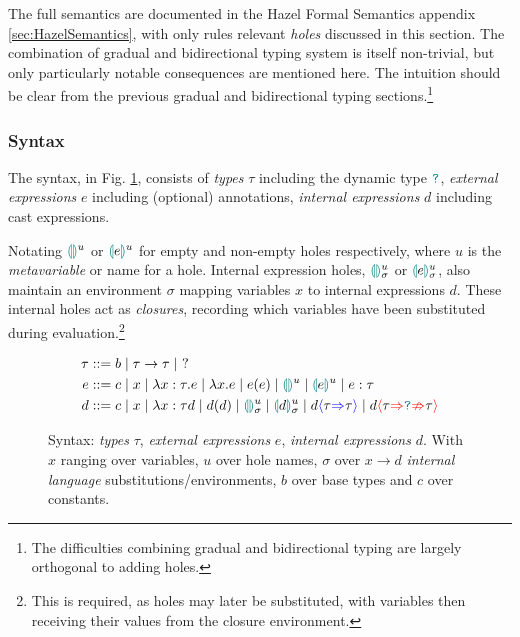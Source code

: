 The full semantics are documented in the Hazel Formal Semantics appendix \ref{sec:HazelSemantics}, with only rules relevant \textit{holes} discussed in this section. The combination of gradual and bidirectional typing system is itself non-trivial, but only particularly notable consequences are mentioned here. The intuition should be clear from the previous gradual and bidirectional typing sections.\footnote{The difficulties combining gradual and bidirectional typing are largely orthogonal to adding holes.}

\subsubsection{Syntax}\label{sec:HazelSyntax}
\par The syntax, in Fig. \ref{fig:syntax}, consists of \textit{types} $\tau$ including the dynamic type $\dyn$, \textit{external expressions} $e$ including (optional) annotations, \textit{internal expressions} $d$ including cast expressions.

Notating $\hole{}^u$ or $\hole[e]^u$ for empty and non-empty holes respectively, where $u$ is the \textit{metavariable} or name for a hole. Internal expression holes, $\hole{}^u_\sigma$ or $\hole[e]^u_\sigma$, also maintain an environment $\sigma$ mapping variables $x$ to internal expressions $d$. These internal holes act as \textit{closures}, recording which variables have been substituted during evaluation.\footnote{This is required, as holes may later be substituted, with variables then receiving their values from the closure environment.}
\begin{figure}[h]
\begin{align*}
\tau &::= b \mid \tau \to \tau \mid\  ?\\
e &::= c \mid x \mid \lambda x : \tau.e \mid \lambda x. e \mid e(e) \mid \hole^u \mid \hole[e]^u \mid e : \tau\\
d &::= c \mid x \mid \lambda x : \tau d \mid d(d) \mid \hole^u_\sigma \mid \hole[d]^u_\sigma \mid d\scast{\tau}{\tau} \mid d\scasterror{\tau}{\tau}
\end{align*}
\caption{Syntax: \textit{types} $\tau$, \textit{external expressions} $e$, \textit{internal expressions} $d$. With $x$ ranging over variables, $u$ over hole names, $\sigma$ over $x \to d$ \textit{internal language} substitutions/environments, $b$ over base types and $c$ over constants.}
\label{fig:syntax}
\end{figure}

